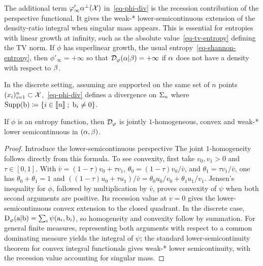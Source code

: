 The additional term $\varphi'_\infty \alpha^{\perp}(\mathcal{X})$ in~\eqref{eq-phi-div} is the recession contribution of the perspective functional. It gives the weak-* lower-semicontinuous extension of the density-ratio integral when singular mass appears. This is essential for entropies with linear growth at infinity, such as the absolute value~\eqref{eq-tv-entropy} defining the TV norm. If $\phi$ has superlinear growth, \eg the usual entropy~\eqref{eq-shannon-entropy}, then $\phi'_\infty=+\infty$ so that $\mathcal{D}_\varphi (\alpha|\beta) = +\infty$ if $\alpha$ does not have a density with respect to $\beta$.

In the discrete setting, assuming
are supported on the same set of $n$ points $(x_i)_{i=1}^n \subset \mathcal{X}$,~\eqref{eq-phi-div} defines a divergence on $\Sigma_n$
where $\operatorname{Supp}(\mathrm{b}) \coloneqq \left\{ i \in \llbracket n\rrbracket \;;\;  \mathrm{b}_i \neq 0  \right\}$.


\begin{proposition}\label{prop-basic-phi-divergence-properties}
If $\phi$ is an entropy function, then $\mathcal{D}_\varphi$ is jointly $1$-homogeneous, convex and weak-* lower semicontinuous in $(\alpha,\beta)$.
\end{proposition}

\begin{proof}
	Introduce the lower-semicontinuous perspective
	The joint $1$-homogeneity follows directly from this formula. To see convexity, first take $v_0,v_1>0$ and $\tau\in[0,1]$. With $\bar v=(1-\tau)v_0+\tau v_1$,
	$\theta_0=(1-\tau)v_0/\bar v$, and $\theta_1=\tau v_1/\bar v$, one has
	$\theta_0+\theta_1=1$ and
	$((1-\tau)u_0+\tau u_1)/\bar v
	=\theta_0u_0/v_0+\theta_1u_1/v_1$.
	Jensen's inequality for $\phi$, followed by multiplication by $\bar v$, proves convexity of $\psi$ when both second arguments are positive. Its recession value at $v=0$ gives the lower-semicontinuous convex extension to the closed quadrant. In the discrete case,
	\(\mathrm{D}_\varphi(\mathrm{a}|\mathrm{b}) = \sum_i \psi(\mathrm{a}_i,\mathrm{b}_i)\),
	so homogeneity and convexity follow by summation. For general finite measures, representing both arguments with respect to a common dominating measure yields the integral of $\psi$; the standard lower-semicontinuity theorem for convex integral functionals gives weak-* lower semicontinuity, with the recession value accounting for singular mass.
\end{proof}


